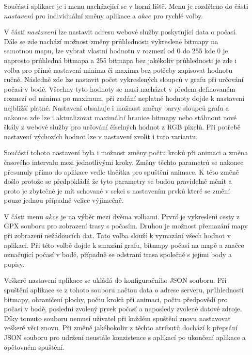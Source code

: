 \documentclass[czech,bachelor,dept460,male,csharp,cpdeclaration]{diploma}
\begin{document}
	Součástí aplikace je i menu nacházející se v horní liště. Menu je rozděleno do části $nastavení$ pro individuální změny aplikace a $akce$ pro rychlé volby.
	
	V části $nastavení$ lze nastavit adresu webové služby poskytující data o počasí. Dále se zde nachází možnost změny průhlednosti vykreslené bitmapy na samotnou mapu, lze vybrat vlastní hodnotu v rozmezí od 0 do 255 kde 0 je naprosto průhledná bitmapa a 255 bitmapa bez jakékoliv průhlednosti je zde i volba pro přímé nastavení minima či maxima bez potřeby zapisovat hodnotu ručně. Následně zde lze nastavit počet vykreslených sloupců v grafu při určování počasí v bodě. Všechny tyto hodnoty se musí nacházet v předem definovaném rozmezí od minima po maximum, při zadání neplatné hodnoty dojde k nastavení nejbližší platné. Nastavení obsahuje i možnost změny barvy sloupců grafu a nakonec zde lze i aktualizovat maximální hranice bitmapy nebo stáhnout nové škály z webové služby pro určování číselných hodnot z RGB pixelů. Při potřebě nastavení výchozích hodnot lze v nastavení zvolit i tuto variantu.
	
	Součástí tohoto nastavení byla i možnost změny počtu kroků při animaci a změna časového intervalu mezi jednotlivými kroky. Změny těchto parametrů se nakonec přesunuly přímo do aplikace vedle tlačítka pro spuštění animace. K této změně došlo protože se předpokládá že tyto parametry se budou pravidelně měnit a proto je zbytečné je mít schované v sekci s nastavením prvků které se změní pouze jednou případně velice výjimečně.
	
	V části menu $akce$ je na výběr mezi dvěma volbami. První je vykreslení cesty z GPX souboru pro zobrazení trasy s počasím. Druhou je možnost přemazání mapy při zobrazení nežádoucích dat. Tato volba slouží k vymazání všech hodnot v aplikaci. Při této volbě dojde k smazání grafu, bitmapy počasí na mapě a značce označující počasí v bodě, případně se odstraní trasa společně s jejími body a popisy.
	
	Veškeré nastavení aplikace se ukládá do konfiguračního JSON souboru. Při spuštění aplikace se z tohoto souboru načtou data o adrese serveru, průhlednosti bitmapy, ohraničení plochy, počtu kroků při animaci, počtu předpovědí pro počasí v bodě, poslední zvolený prvek počasí a naposledy zvolené datové zdroje. Díky tomuto souboru nemusí uživatel při každém spuštění znovu nastavovat veškeré věci znovu. Při změně jakéhokoliv z těchto atributů dochází k přepsání JSON souboru pro udržení neustále konzistence s aplikací po ukončení aplikace a opětovném spuštění.
	
\end{document}

